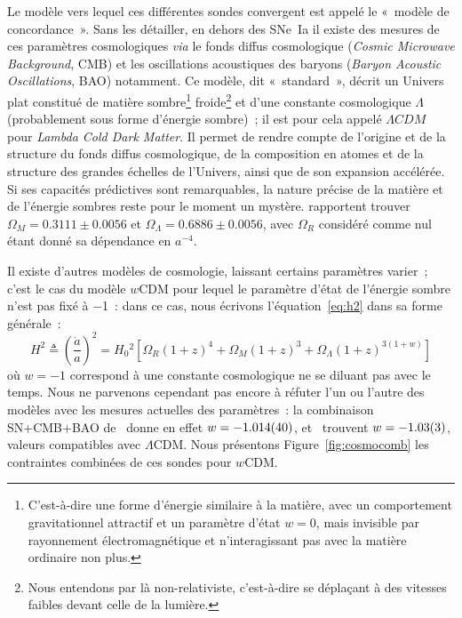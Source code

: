 \documentclass[../main/main.tex]{subfiles}
\begin{document}
Le modèle vers lequel ces différentes sondes convergent est appelé le «~modèle
de concordance~». Sans les détailler, en dehors des SNe~Ia il existe des mesures
de ces paramètres cosmologiques \textit{via} le fonds diffus cosmologique
(\textit{Cosmic Microwave Background}, CMB) et les oscillations acoustiques des
baryons (\textit{Baryon Acoustic Oscillations}, BAO) notamment. Ce modèle, dit
«~standard~», décrit un Univers plat constitué de matière
sombre\footnote{C'est-à-dire une forme d'énergie similaire à la matière, avec un
    comportement gravitationnel attractif et un paramètre d'état $w=0$, mais
    invisible par rayonnement électromagnétique et n'interagissant pas avec la
matière ordinaire non plus.} froide\footnote{Nous entendons par là
    non-relativiste, c'est-à-dire se déplaçant à des vitesses faibles devant
celle de la lumière.} et d'une constante cosmologique $\Lambda$ (probablement
sous forme d'énergie sombre)~; il est pour cela appelé $\Lambda CDM$ pour
\textit{Lambda Cold Dark Matter}. Il permet de rendre compte de l'origine et
de la structure du fonds diffus cosmologique, de la composition en atomes et
de la structure des grandes échelles de l'Univers, ainsi que de son
expansion accélérée. Si ses capacités prédictives sont remarquables, la
nature précise de la matière et de l'énergie sombres reste pour le moment un
mystère. \cite{planck2018} rapportent trouver $\Omega_M = \num{0.3111} \pm
\num{0.0056}$ et $\Omega_\Lambda = \num{0.6886} \pm \num{0.0056}$, avec
$\Omega_R$ considéré comme nul étant donné sa dépendance en $a^{-4}$.

Il existe d'autres modèles de cosmologie, laissant certains paramètres varier~;
c'est le cas du modèle $w$CDM pour lequel le paramètre d'état de l'énergie
sombre n'est pas fixé à \num{-1}~: dans ce cas, nous écrivons
l'équation~\ref{eq:h2} dans sa forme générale~:
\begin{equation}\label{eq:h2w}
    H^2 \triangleq \left( \frac{\dot{a}}{a} \right)^2 =
    H_0{}^2 \left[ \Omega_R \left( 1+z \right)^4 +
        \Omega_M \left( 1+z \right)^3 +
    \Omega_\Lambda \left( 1+z \right)^{3(1+w)} \right]
\end{equation}
où $w=-1$ correspond à une constante cosmologique ne se diluant pas avec le
temps. Nous ne parvenons cependant pas encore à réfuter l'un ou l'autre des
modèles avec les mesures actuelles des paramètres~: la combinaison SN+CMB+BAO
de~\cite{scolnic2018} donne en effet $w = \num{-1.014\pm0.040}$,
et~\cite{planck2018} trouvent $w = \num{-1.03\pm0.03}$, valeurs compatibles avec
$\Lambda$CDM. Nous présentons Figure~\ref{fig:cosmocomb} les contraintes
combinées de ces sondes pour $w$CDM.
\end{document}
